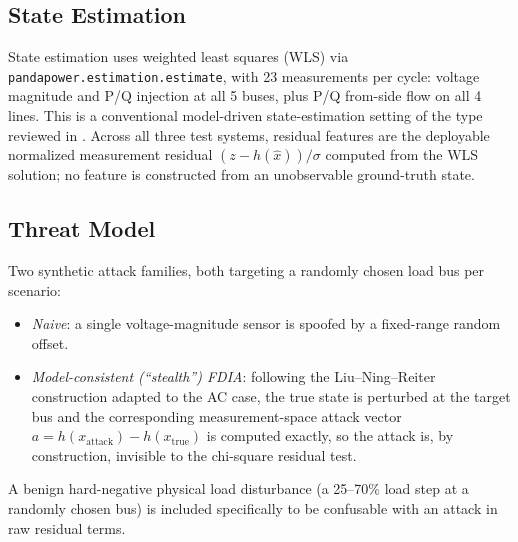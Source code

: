 \documentclass[conference]{IEEEtran}
\begin{document}
\subsection{State Estimation}
State estimation uses weighted least squares (WLS) via \texttt{pandapower.estimation.estimate}, with 23 measurements per cycle: voltage magnitude and P/Q injection at all 5 buses, plus P/Q from-side flow on all 4 lines. This is a conventional model-driven state-estimation setting of the type reviewed in \cite{lin2026state}. Across all three test systems, residual features are the deployable normalized measurement residual $(z-h(\hat{x}))/\sigma$ computed from the WLS solution; no feature is constructed from an unobservable ground-truth state.

\subsection{Threat Model}
Two synthetic attack families, both targeting a randomly chosen load bus per scenario:
\begin{itemize}
\item \emph{Naive}: a single voltage-magnitude sensor is spoofed by a fixed-range random offset.
\item \emph{Model-consistent (``stealth'') FDIA}: following the Liu--Ning--Reiter construction adapted to the AC case, the true state is perturbed at the target bus and the corresponding measurement-space attack vector $a = h(x_{\text{attack}}) - h(x_{\text{true}})$ is computed exactly, so the attack is, by construction, invisible to the chi-square residual test.
\end{itemize}
A benign hard-negative physical load disturbance (a 25--70\% load step at a randomly chosen bus) is included specifically to be confusable with an attack in raw residual terms.
\end{document}
